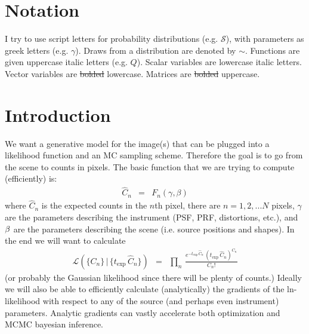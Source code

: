 \documentclass[modern]{aastex62}
\newcommand{\given}{\,|\,}
\newcommand{\counts}{C}
\newcommand{\countrate}{\hat{C}}
\newcommand{\exptime}{t_{\mathrm{exp}}}
\newcommand{\qe}{Q}
\newcommand{\scene}{\mathcal{S}}
\newcommand{\like}{\mathcal{L}}
\begin{document}
\author{Image Forward Modeling Techniques}


\section{Notation}
I try to use script letters for probability distributions (e.g. $\scene$), with parameters as greek letters (e.g. $\gamma$).
Draws from a distribution are denoted by $\sim$.
Functions are given uppercase italic letters (e.g. $\qe$).
Scalar variables are lowercase italic letters.
Vector variables are \sout{bolded} lowercase.
Matrices are \sout{bolded} uppercase.

\section{Introduction}
We want a generative model for the image(s) that can be plugged into a likelihood function and an MC sampling scheme.
Therefore the goal is to go from the scene to counts in pixels.
The basic function that we are trying to compute (efficiently) is:
\begin{eqnarray}
\countrate_n & = & F_n(\gamma, \beta)
\end{eqnarray}
where $\countrate_n$ is the expected counts in the $n$th pixel,
there are $n=1,2,...N$ pixels,
$\gamma$ are the parameters describing the instrument (PSF, PRF, distortions, etc.),
and ${\bf \beta}$ are the parameters describing the scene (i.e. source positions and shapes).
In the end we will want to calculate
\begin{eqnarray}
\like(\{\counts_n\} \given \{\exptime \, \countrate_n\}) & = & \prod_n \, \frac{e^{-\exptime \, \countrate_n} \, (\exptime \, \countrate_n)^{\counts_n}} {\counts_n !}
\end{eqnarray}
(or probably the Gaussian likelihood since there will be plenty of counts.)
Ideally we will also be able to efficiently calculate (analytically) the gradients of the ln-likelihood with respect to any of the source (and perhaps even instrument) parameters.
Analytic gradients can vastly accelerate both optimization and MCMC bayesian inference.
\end{document}
